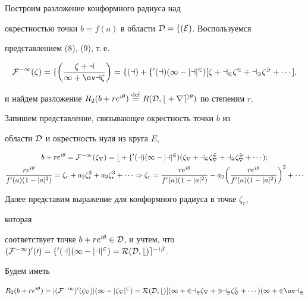 \begin{pf} 


Построим разложение конформного радиуса над 


окрестностью точки $b=f(a)$ в области $\cal D=f(E)$. Воспользуемся 


представлением (8), (9), т.\,е. 


$$ 


\cal F^{-1}(\zeta)=f\bigg(\frac{\zeta+a}{1+\ov a\zeta}\bigg)= 


f(a)+f'(a)(1-|a|^2)[\zeta+a_2\zeta^2+a_3\zeta^3+\dotsb], 


$$ 


и найдем разложение $R_2(b+r e^{i\theta})\eqdef R(\cal D,b+r 


e^{i\theta})$ по степеням $r$. 


 


Запишем представление, связывающее окрестность точки $b$ из 


области $\cal D$ и окрестность нуля из круга $E$, 


\begin{gather*} 


b+r e^{i\theta}=\cal F^{-1}(\zeta_r)=b+f'(a) 


(1-|a|^2)(\zeta_r+a_2\zeta^2_r+a_3\zeta^3_r+\dotsb); \\ 


% 


\frac{r e^{i\theta}}{f'(a)(1-|a|^2)}=\zeta_r+a_2\zeta^2_r+ 


a_3\zeta^3_r+\dotsb\Rightarrow \zeta_r= 


\frac{r e^{i\theta}}{f'(a)(1-|a|^2)}-a_2\bigg( 


\frac{r e^{i\theta}}{f'(a)(1-|a|^2)}\bigg)^2+\dotsb 


\end{gather*} 


Далее представим выражение для конформного радиуса в точке $\zeta_r$, 


которая 


соответствует точке $b+r e^{i\theta}\in\cal D$, и учтем, что $(\cal 


F^{-1})'(0)=f'(a)(1-|a|^2)=R(\cal D,b)e^{-i\beta}$. 


Будем иметь 


\begin{multline*} 


R_2(b+r e^{i\theta})=|(\cal F^{-1})'(\zeta_r)|(1-|\zeta_r|^2)= 


R(\cal D,b)[(1+2a_2\zeta_r+3a_3\zeta^2_r+\dotsb)(1+2\ov a_2 



\end{multline*}
\end{pf}
